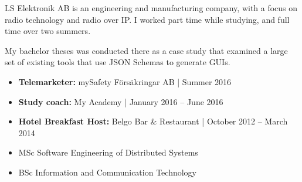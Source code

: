 \documentclass[10pt,a4paper]{altacv}
\begin{document}
\divider

LS Elektronik AB is an engineering and manufacturing company, with a focus on radio technology and radio over IP. I worked part time while studying, and full time over two summers.

My bachelor theses was conducted there as a case study that examined a large set of existing tools that use JSON Schemas to generate GUIs.

\divider

\vspace{-0.5em}
\begin{itemize}
    \item \textbf{Telemarketer:} mySafety Försäkringar AB | Summer 2016
    \item \textbf{Study coach:} My Academy | January 2016 -- June 2016
    \item \textbf{Hotel Breakfast Host:} Belgo Bar \& Restaurant | October 2012 -- March 2014
\end{itemize}


\begin{itemize}
    \item MSc Software Engineering of Distributed Systems
    \item BSc Information and Communication Technology
\end{itemize}


\end{document}
